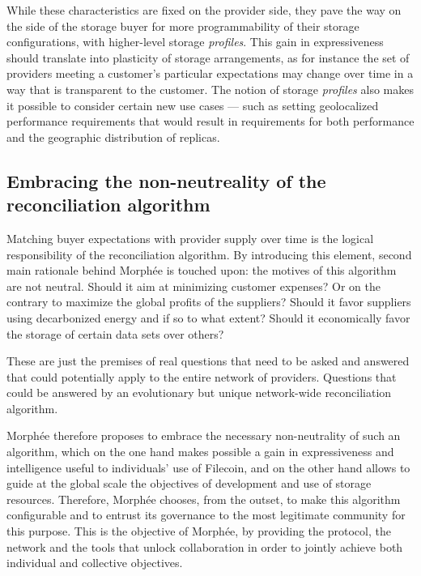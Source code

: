\documentclass[twoside,twocolumn]{article}
\begin{document}
While these characteristics are fixed on the provider side, they pave the way on the side of the storage buyer for more
programmability of their storage configurations, with higher-level storage \emph{profiles}.
This gain in expressiveness should translate into plasticity of storage arrangements,
as for instance the set of providers meeting a customer's particular expectations may change over time in a way that is transparent to the customer.
The notion of storage \emph{profiles} also makes it possible to consider certain new use cases
— such as setting geolocalized performance requirements that would result in requirements for both performance and the geographic distribution of replicas.

\subsection{Embracing the non-neutreality of the reconciliation algorithm}

Matching buyer expectations with provider supply over time is the logical responsibility of the reconciliation algorithm.
By introducing this element, second main rationale behind Morphée is touched upon: the motives of this algorithm are not neutral.
Should it aim at minimizing customer expenses? Or on the contrary to maximize the global profits of the suppliers?
Should it favor suppliers using decarbonized energy and if so to what extent?
Should it economically favor the storage of certain data sets over others?

These are just the premises of real questions that need to be asked and answered that could potentially apply to the entire network of providers.
Questions that could be answered by an evolutionary but unique network-wide reconciliation algorithm.

Morphée therefore proposes to embrace the necessary non-neutrality of such an algorithm,
which on the one hand makes possible a gain in expressiveness and intelligence useful to individuals' use of Filecoin,
and on the other hand allows to guide at the global scale the objectives of development and use of storage resources.
Therefore, Morphée chooses, from the outset, to make this algorithm configurable and to entrust its governance to the most legitimate community for this purpose.
This is the objective of Morphée, by providing the protocol, the network and the tools that unlock collaboration in order to jointly achieve both individual and collective objectives.
\end{document}
